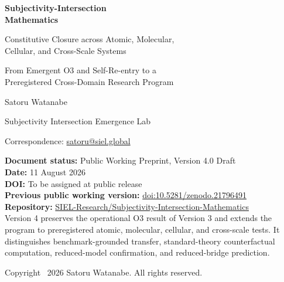 \documentclass[11pt,a4paper]{article}
\begin{document}
\begin{titlepage}
\thispagestyle{empty}
\vspace*{18mm}
{\sffamily\bfseries\color{SIELblue}\fontsize{24}{29}\selectfont
\mbox{Subjectivity-Intersection}\\Mathematics\par}
\vspace{6mm}
{\sffamily\fontsize{18}{23}\selectfont
Constitutive Closure across Atomic, Molecular,\\Cellular, and Cross-Scale Systems\par}
\vspace{7mm}
{\sffamily\fontsize{15}{19}\selectfont
From Emergent O3 and Self-Re-entry to a\\Preregistered Cross-Domain Research Program\par}

\vspace{18mm}
{\large Satoru Watanabe\par}
\vspace{2mm}
{\normalsize Subjectivity Intersection Emergence Lab\par}
{\normalsize Correspondence: \href{mailto:satoru@siel.global}{satoru@siel.global}\par}

\vfill
\noindent\colorbox{SIELlight}{%
  \parbox{0.93\textwidth}{%
  \vspace{2mm}
  \textbf{Document status:} Public Working Preprint, Version 4.0 Draft\\
  \textbf{Date:} 11 August 2026\\
  \textbf{DOI:} To be assigned at public release\\
  \textbf{Previous public working version:} \href{https://doi.org/10.5281/zenodo.21796491}{doi:10.5281/zenodo.21796491}\\
  \textbf{Repository:} \href{https://github.com/SIEL-Research/Subjectivity-Intersection-Mathematics}{SIEL-Research/Subjectivity-Intersection-Mathematics}\\
  Version 4 preserves the operational O3 result of Version 3 and extends the program to preregistered atomic, molecular, cellular, and cross-scale tests. It distinguishes benchmark-grounded transfer, standard-theory counterfactual computation, reduced-model confirmation, and reduced-bridge prediction.
  \vspace{2mm}
  }}

\vspace{10mm}
{\small Copyright \textcopyright\ 2026 Satoru Watanabe. All rights reserved.\par}
\end{titlepage}
\end{document}
